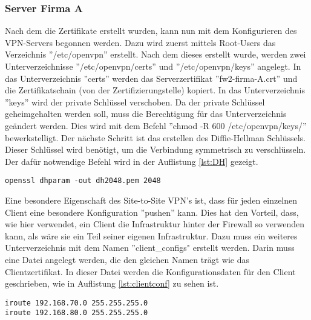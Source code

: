 \subsubsection{Server Firma A}
Nach dem die Zertifikate erstellt wurden, kann nun mit dem Konfigurieren des VPN-Servers begonnen werden. Dazu wird zuerst mittels Root-Users das Verzeichnis ''/etc/openvpn'' erstellt. Nach dem dieses erstellt wurde, werden zwei Unterverzeichnisse ''/etc/openvpn/certs'' und ''/etc/openvpn/keys'' angelegt. In das Unterverzeichnis ''certs'' werden das Serverzertifikat ''fw2-firma-A.crt'' und die Zertifikatschain (von der Zertifizierungstelle) kopiert. In das Unterverzeichnis ''keys'' wird der private Schlüssel verschoben. Da der private Schlüssel geheimgehalten werden soll, muss die Berechtigung für das Unterverzeichnis geändert werden. Dies wird mit dem Befehl ''chmod -R 600 /etc/openvpn/keys/'' bewerkstelligt. Der nächste Schritt ist das erstellen des Diffie-Hellman Schlüssels. Dieser Schlüssel wird benötigt, um die Verbindung symmetrisch zu verschlüsseln. Der dafür notwendige Befehl wird in der Auflistung \ref{lst:DH} gezeigt.\newline
\lstset{
	basicstyle=\footnotesize, frame=tb,
	xleftmargin=.2\textwidth, xrightmargin=.2\textwidth
}
\begin{lstlisting}[caption={Erzeugen des Diffie-Hellman Schlüssels},label=lst:DH]
openssl dhparam -out dh2048.pem 2048
\end{lstlisting}
\vspace{\baselineskip}
Eine besondere Eigenschaft des Site-to-Site VPN's ist, dass für jeden einzelnen Client eine besondere Konfiguration ''pushen'' kann. Dies hat den Vorteil, dass, wie hier verwendet, ein Client die Infrastruktur hinter der Firewall so verwenden kann, als wäre sie ein Teil seiner eigenen Infrastruktur. Dazu muss ein weiteres Unterverzeichnis mit dem Namen ''client\_configs" erstellt werden. Darin muss eine Datei angelegt werden, die den gleichen Namen trägt wie das Clientzertifikat. In dieser Datei werden die Konfigurationsdaten für den Client geschrieben, wie in Auflistung \ref{lst:clientconf} zu sehen ist.\newline
\lstset{
	basicstyle=\footnotesize, frame=tb,
	xleftmargin=.2\textwidth, xrightmargin=.2\textwidth
}
\begin{lstlisting}[caption={Clientkonfigurationsdatei fw-firma-b},label=lst:clientconf]
iroute 192.168.70.0 255.255.255.0
iroute 192.168.80.0 255.255.255.0
\end{lstlisting}
\vspace{\baselineskip}
